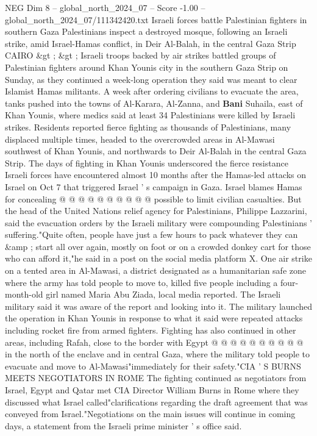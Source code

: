 \begin{textsample}{NEG Dim 8 – global\_north\_2024\_07 – Score -1.00 – global\_north\_2024\_07/111342420.txt}  \label{ex:f8_neg_416}
Israeli forces battle Palestinian fighters in southern Gaza Palestinians inspect a destroyed mosque, following an Israeli strike, amid Israel-Hamas conflict, in Deir Al-Balah, in the central Gaza Strip CAIRO \&gt ; \&gt ; Israeli troops backed by air strikes battled groups of Palestinian fighters around Khan Younis city in the southern Gaza Strip on Sunday, as they continued a week-long operation they said was meant to clear Islamist Hamas militants.
A week after ordering civilians to evacuate the area, tanks pushed into the towns of Al-Karara, Al-Zanna, and \textbf{Bani} Suhaila, east of Khan Younis, where medics said at least 34 Palestinians were killed by Israeli strikes.
Residents reported fierce fighting as thousands of Palestinians, many displaced multiple times, headed to the overcrowded areas in Al-Mawasi southwest of Khan Younis, and northwards to Deir Al-Balah in the central Gaza Strip.
The days of fighting in Khan Younis underscored the fierce resistance Israeli forces have encountered almost 10 months after the Hamas-led attacks on Israel on Oct 7 that triggered Israel ' s campaign in Gaza.
Israel blames Hamas for concealing @ @ @ @ @ @ @ @ @ @ possible to limit civilian casualties.
But the head of the United Nations relief agency for Palestinians, Philippe Lazzarini, said the evacuation orders by the Israeli military were compounding Palestinians ' suffering."Quite often, people have just a few hours to pack whatever they can \&amp ; start all over again, mostly on foot or on a crowded donkey cart for those who can afford it,"he said in a post on the social media platform X.
One air strike on a tented area in Al-Mawasi, a district designated as a humanitarian safe zone where the army has told people to move to, killed five people including a four-month-old girl named Maria Abu Ziada, local media reported.
The Israeli military said it was aware of the report and looking into it.
The military launched the operation in Khan Younis in response to what it said were repeated attacks including rocket fire from armed fighters.
Fighting has also continued in other areas, including Rafah, close to the border with Egypt @ @ @ @ @ @ @ @ @ @ in the north of the enclave and in central Gaza, where the military told people to evacuate and move to Al-Mawasi"immediately for their safety."CIA ' S BURNS MEETS NEGOTIATORS IN ROME The fighting continued as negotiators from Israel, Egypt and Qatar met CIA Director William Burns in Rome where they discussed what Israel called"clarifications regarding the draft agreement that was conveyed from Israel."Negotiations on the main issues will continue in coming days, a statement from the Israeli prime minister ' s office said.

\end{textsample}
